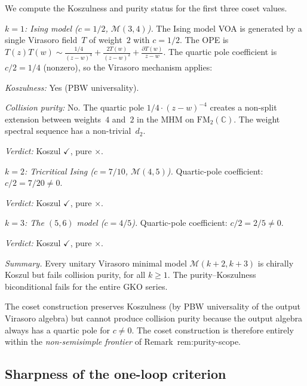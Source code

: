 \documentclass[11pt]{article}
\newcommand{\C}{\mathbb{C}}
\newcommand{\FM}{\mathrm{FM}}
\begin{document}
\begin{computation}[Koszulness and purity for $k = 1, 2, 3$]
\label{comp:coset-k123}%
We compute the Koszulness and purity status for the
first three coset values.

\smallskip\noindent
\emph{$k = 1$: Ising model ($c = 1/2$, $\mathcal{M}(3,4)$).}
The Ising model VOA is generated by a single Virasoro field~$T$
of weight~$2$ with $c = 1/2$.  The OPE is
$T(z)T(w) \sim \frac{1/4}{(z-w)^4} + \frac{2T(w)}{(z-w)^2}
+ \frac{\partial T(w)}{z-w}$.
The quartic pole coefficient is $c/2 = 1/4$ (nonzero), so
the Virasoro mechanism applies:

\emph{Koszulness:} Yes (PBW universality).

\emph{Collision purity:} No.  The quartic pole
$1/4 \cdot (z-w)^{-4}$ creates a non-split extension between
weights~$4$ and~$2$ in the MHM on $\FM_2(\C)$.
The weight spectral sequence has a non-trivial~$d_2$.

\emph{Verdict:} Koszul $\checkmark$, pure $\times$.

\smallskip\noindent
\emph{$k = 2$: Tricritical Ising ($c = 7/10$,
$\mathcal{M}(4,5)$).}
Quartic-pole coefficient: $c/2 = 7/20 \neq 0$.

\emph{Verdict:} Koszul $\checkmark$, pure $\times$.

\smallskip\noindent
\emph{$k = 3$: The $(5,6)$ model ($c = 4/5$).}
Quartic-pole coefficient: $c/2 = 2/5 \neq 0$.

\emph{Verdict:} Koszul $\checkmark$, pure $\times$.

\smallskip\noindent
\emph{Summary.}
Every unitary Virasoro minimal model $\mathcal{M}(k{+}2,
k{+}3)$ is chirally Koszul but fails collision purity,
for all $k \geq 1$.  The purity--Koszulness biconditional fails
for the entire GKO series.
\end{computation}

\begin{remark}
The coset construction preserves Koszulness (by PBW
universality of the output Virasoro algebra) but
cannot produce collision purity because the output
algebra always has a quartic pole for $c \neq 0$.
The coset construction is therefore entirely within the
\emph{non-semisimple frontier} of
Remark~rem:purity-scope.
\end{remark}

\subsection{Sharpness of the one-loop criterion}
\label{subsec:one-loop-sharpness}
\end{document}
